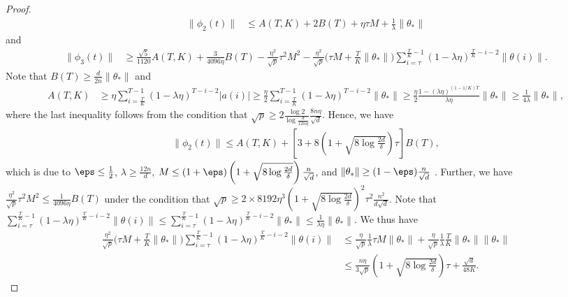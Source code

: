 \begin{proof}
    \begin{align*}
        \|\phi_{2}(t)\| & \leq A(T,K) + 2B(T) + \eta\tau M + \frac{1}{\lambda} \|\theta_*\|
    \end{align*}
    and
    \begin{align*}
        \|\phi_{3}(t)\| & \geq \frac{\sqrt{5}}{1120} A(T,K) + \frac{3}{4096\eta} B(T) - \frac{\eta^2}{\sqrt p} \tau^2 M^2 - \frac{\eta^2}{\sqrt p} \Big( \tau M + \frac{T}{K} \|\theta_*\| \Big) \sum_{i=\tau}^{\frac{T}{K}-1}(1 - \lambda\eta)^{\frac{T}{K}-i-2} \|\theta(i)\|.
    \end{align*}
    Note that $B(T) \geq \frac{d}{2n} \|\theta_*\|$ and
    \begin{align*}
        A(T,K) & \geq \eta\sum_{i=\frac{T}{K}}^{T-1}(1-\lambda\eta)^{T-i-2} |a(i)| \geq \frac{\eta}{2}\sum_{i=\frac{T}{K}}^{T-1}(1-\lambda\eta)^{T-i-2} \|\theta_*\| \geq \frac{\eta}{2} \frac{1 - (\lambda\eta)^{(1-1/K)T}}{\lambda\eta} \|\theta_*\| \geq \frac{1}{4\lambda} \|\theta_*\|,
    \end{align*}
    where the last inequality follows from the condition that $\sqrt{p} \geq 2 \frac{\log 2}{\log\frac{d}{12n\eta}}\frac{8n\eta}{\sqrt{d}}$. Hence, we have 
    \begin{align*}
        \|\phi_{2}(t)\| \leq A(T,K) + \left[ 3 + 8\left(1 + \sqrt{8\log\frac{2d}{\delta}}\right)\tau \right] B(T),
    \end{align*}
    which is due to $\eps\leq \frac{1}{2}$, $\lambda \geq \frac{12n}{d}$, $M \leq (1+\eps)\left(1 + \sqrt{8\log\frac{2d}{\delta}}\right)\frac{n}{\sqrt{d}}$, and $\|\theta_*\|\geq (1-\eps)\frac{n}{\sqrt{d}}$ . Further, we have $\frac{\eta^2}{\sqrt p} \tau^2 M^2 \leq \frac{1}{4096\eta} B(T)$ under the condition that $\sqrt{p} \geq 2\times 8192\eta^3\left(1 + \sqrt{8\log\frac{2d}{\delta}}\right)^2 \tau^2 \frac{n^2}{d\sqrt{d}}$. Note that $\sum_{i=\tau}^{\frac{T}{K}-1}(1 - \lambda\eta)^{\frac{T}{K}-i-2} \|\theta(i)\| \leq \sum_{i=\tau}^{\frac{T}{K}-1}(1 - \lambda\eta)^{\frac{T}{K}-i-2} \|\theta_*\| \leq \frac{1}{\lambda\eta} \|\theta_*\|$. We thus have 
    \begin{align*}
        \frac{\eta^2}{\sqrt p} \Big( \tau M + \frac{T}{K} \|\theta_*\| \Big) \sum_{i=\tau}^{\frac{T}{K}-1}(1 - \lambda\eta)^{\frac{T}{K}-i-2} \|\theta(i)\| & \leq \frac{\eta}{\sqrt p} \frac{1}{\lambda} \tau M \|\theta_*\| + \frac{\eta}{\sqrt p} \frac{1}{\lambda} \frac{T}{K} \|\theta_*\| \|\theta_*\| \\
        & \leq \frac{n\eta}{3\sqrt{p}} \left(1 + \sqrt{8\log\frac{2d}{\delta}}\right) \tau + \frac{\sqrt{d}}{48K}.

\end{align*}
\end{proof}
